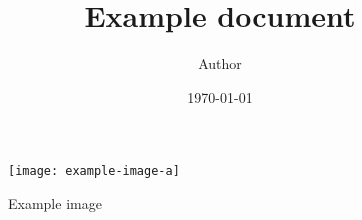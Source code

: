 \documentclass[polish,10pt,a4paper,oneside]{article}
\begin{document}
\title{Example document}
\author{Author}
\date{\today}
\maketitle

\lipsum[1]

\begin{figure}[htbp]
    \centering
    \texttt{[image: example-image-a]}
    \caption[skocont]{Example image}
    \label{fig:example}
\end{figure}

\textbf{\lipsum[2]}
\end{document}
